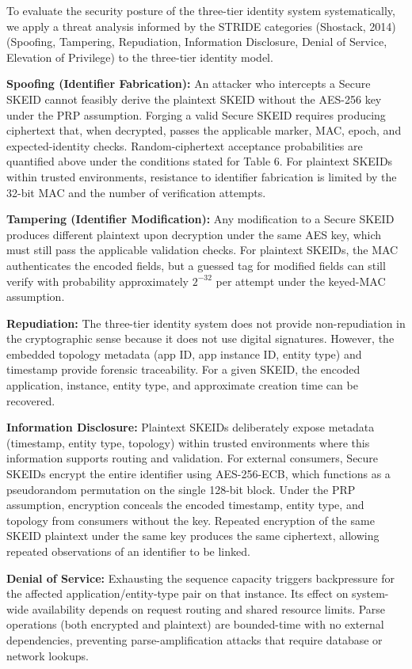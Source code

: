 \documentclass[fleqn,10pt]{wlpeerj}
\begin{document}
To evaluate the security posture of the three-tier identity system
systematically, we apply a threat analysis informed by the STRIDE
categories (Shostack, 2014) (Spoofing, Tampering, Repudiation,
Information Disclosure, Denial of Service, Elevation of Privilege) to
the three-tier identity model.

\textbf{Spoofing (Identifier Fabrication):} An attacker who intercepts a
Secure SKEID cannot feasibly derive the plaintext SKEID without the
AES-256 key under the PRP assumption. Forging a valid Secure SKEID
requires producing ciphertext that, when decrypted, passes the
applicable marker, MAC, epoch, and expected-identity checks.
Random-ciphertext acceptance probabilities are quantified above under
the conditions stated for Table 6. For plaintext SKEIDs within trusted
environments, resistance to identifier fabrication is limited by the
32-bit MAC and the number of verification attempts.

\textbf{Tampering (Identifier Modification):} Any modification to a
Secure SKEID produces different plaintext upon decryption under the same
AES key, which must still pass the applicable validation checks. For
plaintext SKEIDs, the MAC authenticates the encoded fields, but a
guessed tag for modified fields can still verify with probability
approximately \(2^{-32}\) per attempt under the keyed-MAC assumption.

\textbf{Repudiation:} The three-tier identity system does not provide
non-repudiation in the cryptographic sense because it does not use
digital signatures. However, the embedded topology metadata (app ID, app
instance ID, entity type) and timestamp provide forensic traceability.
For a given SKEID, the encoded application, instance, entity type, and
approximate creation time can be recovered.

\textbf{Information Disclosure:} Plaintext SKEIDs deliberately expose
metadata (timestamp, entity type, topology) within trusted environments
where this information supports routing and validation. For external
consumers, Secure SKEIDs encrypt the entire identifier using
AES-256-ECB, which functions as a pseudorandom permutation on the single
128-bit block. Under the PRP assumption, encryption conceals the encoded
timestamp, entity type, and topology from consumers without the key.
Repeated encryption of the same SKEID plaintext under the same key
produces the same ciphertext, allowing repeated observations of an
identifier to be linked.

\textbf{Denial of Service:} Exhausting the sequence capacity triggers
backpressure for the affected application/entity-type pair on that
instance. Its effect on system-wide availability depends on request
routing and shared resource limits. Parse operations (both encrypted and
plaintext) are bounded-time with no external dependencies, preventing
parse-amplification attacks that require database or network lookups.
\end{document}
